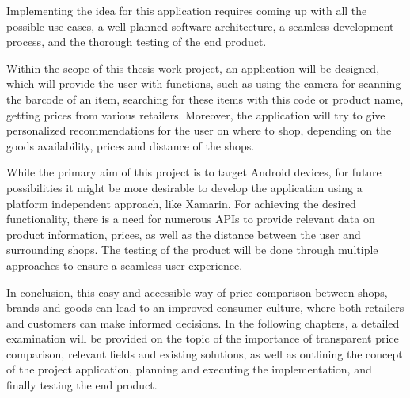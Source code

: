 Implementing the idea for this application requires coming up with all the possible use cases, a well planned  software architecture, a seamless development process, and the thorough testing of the end product. 

\pagebreak

Within the scope of this thesis work project, an application will be designed, which will provide the user with functions, such as using the camera for scanning the barcode of an item, searching for these items with this code or product name, getting prices from various retailers. Moreover, the application will try to give personalized recommendations for the user on where to shop, depending on the goods availability, prices and distance of the shops.

While the primary aim of this project is to target Android devices, for future possibilities it might be more desirable to develop the application using a platform independent approach, like Xamarin. For achieving the desired functionality, there is a need for numerous APIs to provide relevant data on product information, prices, as well as the distance between the user and surrounding shops. The testing of the product will be done through multiple approaches to ensure a seamless user experience.

In conclusion, this easy and accessible way of price comparison between shops, brands and goods can lead to an improved consumer culture, where both retailers and customers can make informed decisions. In the following chapters, a detailed examination will be provided on the topic of the importance of transparent price comparison, relevant fields and existing solutions, as well as outlining the concept of the project application, planning and executing the implementation, and finally testing the end product.



